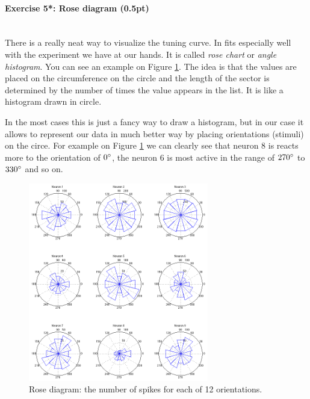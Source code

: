 \documentclass[a4paper,11pt]{article}
\newenvironment{exercise}[3]{\paragraph{Exercise #1: #2 (#3pt)}\ \\}{
\medskip}
\begin{document}
\begin{exercise}{5*}{Rose diagram}{0.5}
There is a really neat way to visualize the tuning curve. In fits especially well with the experiment we have at our hands. It is called \emph{rose chart} or \emph{angle histogram}. You can see an example on Figure \ref{fig:rosediag}. The idea is that the values are placed on the circumference on the circle and the length of the sector is determined by the number of times the value appears in the list. It is like a histogram drawn in circle.

In the most cases this is just a fancy way to draw a histogram, but in our case it allows to represent our data in much better way by placing orientations (stimuli) on the circe. For example on Figure \ref{fig:rosediag} we can clearly see that neuron 8 is reacts more to the orientation of $0\degree$, the neuron 6 is most active in the range of $270\degree$ to $330\degree$ and so on.

\begin{figure}[H]
   \centering
   \includegraphics[width=0.7\textwidth]{rosediag.png} 
   \caption{Rose diagram: the number of spikes for each of 12 orientations.}
   \label{fig:rosediag}
\end{figure}


\end{exercise}
\end{document}
